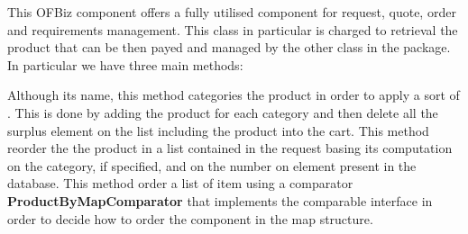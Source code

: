 This OFBiz component offers a fully utilised component for request, quote, order and requirements management.
This class in particular is charged to retrieval the product that can be then payed and managed by the other class in the
package.
In particular we have three main methods:
\begin{itemize}
  Although its name, this method categories the product in order to
  apply a sort of . This is done by adding the product for
  each category and then delete all the surplus element on the list including the product into the cart.
  This method reorder the the product in a list contained in the request basing its computation
  on the category, if specified, and on the number on element present in the database.
  This method order a list of item using a comparator \textbf{ProductByMapComparator} that implements the comparable interface
  in order to decide how to order the component in the map structure. 
\end{itemize}

